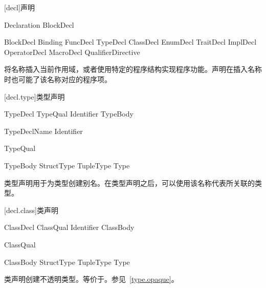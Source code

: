 
[decl]{声明}

\begin{bnf}{Declaration}
    BlockDecl
\end{bnf}

\begin{bnf}{BlockDecl}
    Binding \br
    FuncDecl \br
    TypeDecl \br
    ClassDecl \br
    EnumDecl \br
    TraitDecl \br
    ImplDecl \br
    OperatorDecl \br
    MacroDecl \br
    QualifierDirective
\end{bnf}

\pnum
{}将名称插入当前作用域，或者使用特定的程序结构实现程序功能。声明在插入名称时也可能了该名称对应的程序项。

[decl.type]{类型声明}

\begin{bnf}{TypeDecl}
    TypeQual\bnfs {} Identifier TypeBody
\end{bnf}

\begin{bnf}{TypeDeclName}
    Identifier \br
\end{bnf}

\begin{bnf}{TypeQual}
\end{bnf}

\begin{bnf}{TypeBody}
    StructType \br
    TupleType \br
    \terminal{=} Type
\end{bnf}

\pnum
类型声明用于为类型创建别名。在类型声明之后，可以使用该名称代表所关联的类型。

[decl.class]{类声明}

\begin{bnf}{ClassDecl}
    ClassQual\bnfs {} Identifier ClassBody
\end{bnf}

\begin{bnf}{ClassQual}
\end{bnf}

\begin{bnf}{ClassBody}
    StructType \br
    TupleType \br
    \terminal{=} Type
\end{bnf}

\pnum
类声明创建不透明类型。等价于。参见~\ref{type.opaque}。

